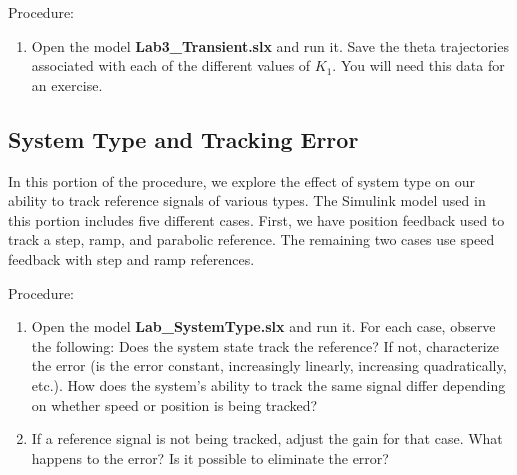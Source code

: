\documentclass[11pt,a4paper]{article}
\begin{document}
Procedure:
\begin{enumerate}
\item Open the model \textbf{Lab3\_Transient.slx} and run it. Save the theta trajectories associated with each of the different values of $K_{1}$. You will need this data for an exercise.
\end{enumerate}

\subsection{System Type and Tracking Error}
In this portion of the procedure, we explore the effect of system type on our ability to track reference signals of various types. The Simulink model used in this portion includes five different cases. First, we have position feedback used to track a step, ramp, and parabolic reference. The remaining two cases use speed feedback with step and ramp references. 

Procedure:
\begin{enumerate}
\item Open the model \textbf{Lab\_SystemType.slx} and run it. For each case, observe the following: Does the system state track the reference? If not, characterize the error (is the error constant, increasingly linearly, increasing quadratically, etc.). How does the system's ability to track the same signal differ depending on whether speed or position is being tracked?

\item If a reference signal is not being tracked, adjust the gain for that case. What happens to the error? Is it possible to eliminate the error?

\end{enumerate}
\end{document}
